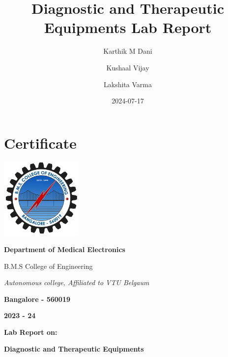\documentclass[
  11pt,
  letterpaper,
  DIV=11,
  numbers=noendperiod]{scrreprt}
\title{Diagnostic and Therapeutic Equipments Lab Report}
\author{Karthik M Dani \and Kushaal Vijay \and Lakshita Varma}
\date{2024-07-17}
\renewcommand*\contentsname{Table of contents}
\newcommand\contentsname{Table of contents}
\begin{document}
\maketitle

\renewcommand*\contentsname{Table of Contents}
{
\hypersetup{linkcolor=}
\setcounter{tocdepth}{0}
\tableofcontents
}

\chapter*{Certificate}\label{certificate}


\begin{center}
    \includegraphics[width=0.3\textwidth]{bmsce_logo.svg.png} %
\end{center}

\begin{center}
    \LARGE \textbf{Department of Medical Electronics}
\end{center}

\begin{center}
    \large B.M.S College of Engineering
\end{center}

\begin{center}
    \textit{Autonomous college, Affiliated to VTU Belgaum}
\end{center}

\begin{center}
    \textbf{Bangalore - 560019}
\end{center}

\begin{center}
    \textbf{2023 - 24}
\end{center}


\begin{center}
    \textbf{Lab Report on:}
\end{center}

\begin{center}
    \large \textbf{Diagnostic and Therapeutic Equipments}
\end{center}
\end{document}
